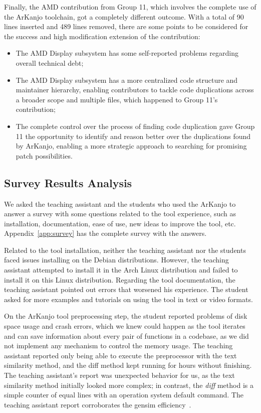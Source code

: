 Finally, the AMD contribution from Group 11, which involves the complete use of the ArKanjo toolchain, 
got a completely different outcome. With a total of 90 lines inserted and 489 lines 
removed, there are some points to be considered for the success and high modification 
extension of the contribution:

\begin{itemize}
    \item The AMD Display subsystem has some self-reported problems regarding overall technical debt;
    \item The AMD Display subsystem has a more centralized code structure and maintainer hierarchy, enabling contributors to tackle code duplications across a broader scope and multiple files, which happened to Group 11's contribution;
    \item The complete control over the process of finding code duplication gave Group 11 the opportunity to identify and reason better over the duplications found by ArKanjo, enabling a more strategic approach to searching for promising patch possibilities.
\end{itemize}

\subsection{Survey Results Analysis}

We asked the teaching assistant and the students who used the ArKanjo to answer a survey with 
some questions related to the tool experience, such as installation, documentation, ease of 
use, new ideas to improve the tool, etc. Appendix~\ref{app:survey} has the complete survey 
with the answers.

Related to the tool installation, neither the teaching assistant nor the students faced issues 
installing on the Debian distributions. However, the teaching assistant attempted to install it 
in the Arch Linux distribution and failed to install it on this Linux distribution. 
Regarding the tool documentation, the teaching assistant pointed out errors that worsened his 
experience. The student asked for more examples and tutorials on using the tool in text or 
video formats.

On the ArKanjo tool preprocessing step, the student reported problems of disk space usage and 
crash errors, which we knew could happen as the tool iterates and can save information about 
every pair of functions in a codebase, as we did not implement any mechanism to control the 
memory usage. The teaching assistant reported only being able to execute the preprocessor with 
the text similarity method, and the diff method kept running for hours without finishing. 
The teaching assistant's report was unexpected behavior for us, as the text similarity method 
initially looked more complex; in contrast, the \textit{diff} method is a simple counter of equal lines 
with an operation system default command. The teaching assistant report corroborates the 
gensim efficiency~\citep{gensim}.

